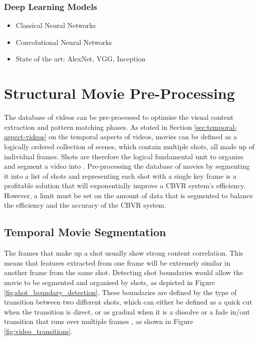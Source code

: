 \subsubsection{Deep Learning Models}

\begin{itemize}
    \item Classical Neural Networks
    \item Convolutional Neural Networks
    \item State of the art: AlexNet, VGG, Inception
\end{itemize}


\section{Structural Movie Pre-Processing}
\label{sec:movie-pre-processing}

The database of videos can be pre-processed to optimise the visual content extraction and pattern matching phases. As stated in Section \ref{sec:temporal-aspect-videos} on the temporal aspects of videos, movies can be defined as a logically ordered collection of scenes, which contain multiple shots, all made up of individual frames. Shots are therefore the logical fundamental unit to organise and segment a video into \cite{hu2011survey}. Pre-processing the database of movies by segmenting it into a list of shots and representing each shot with a single key frame is a profitable solution that will exponentially improve a CBVR system's efficiency. However, a limit must be set on the amount of data that is segmented to balance the efficiency and the accuracy of the CBVR system.


\subsection{Temporal Movie Segmentation}

The frames that make up a shot usually show strong content correlation. This means that features extracted from one frame will be extremely similar in another frame from the same shot. Detecting shot boundaries would allow the movie to be segmented and organised by shots, as depicted in Figure \ref{fig:shot_boundary_detection}. These boundaries are defined by the type of transition between two different shots, which can either be defined as a quick cut when the transition is direct, or as gradual when it is a dissolve or a fade in/out transition that runs over multiple frames \cite{yuan2007shotboundary}, as shown in Figure \ref{fig:video_transitions}.

